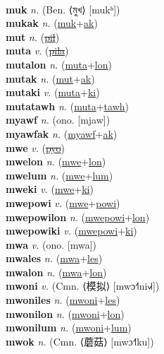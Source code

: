  \label{muf} \\
\textbf{muk} \textit{n.} (Ben. ⟨মুখ⟩ [mukʰ])
 \label{muk} \\
\textbf{mukak} \textit{n.} (\hyperref[muk]{muk}+\hyperref[ak]{ak})
 \label{mukak} \\
\textbf{mut} \textit{n.} (\hyperref[pil]{\sout{pil}})
 \label{mut} \\
\textbf{muta} \textit{v.} (\hyperref[pila]{\sout{pila}})
 \label{muta} \\
\textbf{mutalon} \textit{n.} (\hyperref[muta]{muta}+\hyperref[lon]{lon})
 \label{mutalon} \\
\textbf{mutak} \textit{n.} (\hyperref[mut]{mut}+\hyperref[ak]{ak})
 \label{mutak} \\
\textbf{mutaki} \textit{v.} (\hyperref[muta]{muta}+\hyperref[ki]{ki})
 \label{mutaki} \\
\textbf{mutatawh} \textit{n.} (\hyperref[muta]{muta}+\hyperref[tawh]{tawh})
 \label{mutatawh} \\
\textbf{myawf} \textit{n.} (ono. [mjaw])
 \label{myawf} \\
\textbf{myawfak} \textit{n.} (\hyperref[myawf]{myawf}+\hyperref[ak]{ak})
 \label{myawfak} \\
\textbf{mwe} \textit{v.} (\hyperref[pyo]{\sout{pyo}})
 \label{mwe} \\
\textbf{mwelon} \textit{n.} (\hyperref[mwe]{mwe}+\hyperref[lon]{lon})
 \label{mwelon} \\
\textbf{mwelum} \textit{n.} (\hyperref[mwe]{mwe}+\hyperref[lum]{lum})
 \label{mwelum} \\
\textbf{mweki} \textit{v.} (\hyperref[mwe]{mwe}+\hyperref[ki]{ki})
 \label{mweki} \\
\textbf{mwepowi} \textit{v.} (\hyperref[mwe]{mwe}+\hyperref[powi]{powi})
 \label{mwepowi} \\
\textbf{mwepowilon} \textit{n.} (\hyperref[mwepowi]{mwepowi}+\hyperref[lon]{lon})
 \label{mwepowilon} \\
\textbf{mwepowiki} \textit{v.} (\hyperref[mwepowi]{mwepowi}+\hyperref[ki]{ki})
 \label{mwepowiki} \\
\textbf{mwa} \textit{v.} (ono. [mwa])
 \label{mwa} \\
\textbf{mwales} \textit{n.} (\hyperref[mwa]{mwa}+\hyperref[les]{les})
 \label{mwales} \\
\textbf{mwalon} \textit{n.} (\hyperref[mwa]{mwa}+\hyperref[lon]{lon})
 \label{mwalon} \\
\textbf{mwoni} \textit{v.} (Cmn. ⟨模拟⟩ [mwɔ˧˥ni˧˩˧])
 \label{mwoni} \\
\textbf{mwoniles} \textit{n.} (\hyperref[mwoni]{mwoni}+\hyperref[les]{les})
 \label{mwoniles} \\
\textbf{mwonilon} \textit{n.} (\hyperref[mwoni]{mwoni}+\hyperref[lon]{lon})
 \label{mwonilon} \\
\textbf{mwonilum} \textit{n.} (\hyperref[mwoni]{mwoni}+\hyperref[lum]{lum})
 \label{mwonilum} \\
\textbf{mwok} \textit{n.} (Cmn. ⟨蘑菇⟩ [mwɔ˧˥ku])
 \label{mwok} \\
